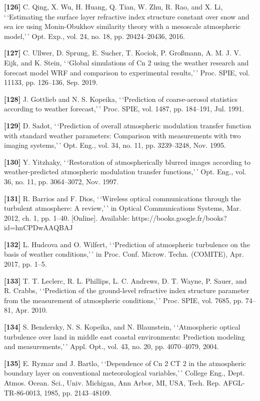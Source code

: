 \documentclass[
]{article}
\begin{document}
\textbf{{[}126{]}} C. Qing, X. Wu, H. Huang, Q. Tian, W. Zhu, R. Rao,
and X. Li, `\,`Estimating the surface layer refractive index structure
constant over snow and sea ice using Monin-Obukhov similarity theory
with a mesoscale atmospheric model,'\,' Opt. Exp., vol. 24, no. 18, pp.
20424--20436, 2016.

\textbf{{[}127{]}} C. Ullwer, D. Sprung, E. Sucher, T. Kociok, P.
Großmann, A. M. J. V. Eijk, and K. Stein, `\,`Global simulations of Cn 2
using the weather research and forecast model WRF and comparison to
experimental results,'\,' Proc. SPIE, vol. 11133, pp. 126--136, Sep.
2019.

\textbf{{[}128{]}} J. Gottlieb and N. S. Kopeika, `\,`Prediction of
coarse-aerosol statistics according to weather forecast,'\,' Proc. SPIE,
vol. 1487, pp. 184--191, Jul. 1991.

\textbf{{[}129{]}} D. Sadot, `\,`Prediction of overall atmospheric
modulation transfer function with standard weather parameters:
Comparison with measurements with two imaging systems,'\,' Opt. Eng.,
vol. 34, no. 11, pp. 3239--3248, Nov. 1995.

\textbf{{[}130{]}} Y. Yitzhaky, `\,`Restoration of atmospherically
blurred images according to weather-predicted atmospheric modulation
transfer functions,'\,' Opt. Eng., vol. 36, no. 11, pp. 3064--3072, Nov.
1997.

\textbf{{[}131{]}} R. Barrios and F. Dios, `\,`Wireless optical
communications through the turbulent atmosphere: A review,'\,' in
Optical Communications Systems, Mar. 2012, ch. 1, pp. 1--40.
{[}Online{]}. Available: https://books.google.fr/books?id=hnCPDwAAQBAJ

\textbf{{[}132{]}} L. Hudcova and O. Wilfert, `\,`Prediction of
atmospheric turbulence on the basis of weather conditions,'\,' in Proc.
Conf. Microw. Techn. (COMITE), Apr. 2017, pp. 1--5.

\textbf{{[}133{]}} T. T. Leclerc, R. L. Phillips, L. C. Andrews, D. T.
Wayne, P. Sauer, and R. Crabbs, `\,`Prediction of the ground-level
refractive index structure parameter from the measurement of atmospheric
conditions,'\,' Proc. SPIE, vol. 7685, pp. 74--81, Apr. 2010.

\textbf{{[}134{]}} S. Bendersky, N. S. Kopeika, and N. Blaunstein,
`\,`Atmospheric optical turbulence over land in middle east coastal
environments: Prediction modeling and measurements,'\,' Appl. Opt., vol.
43, no. 20, pp. 4070--4079, 2004.

\textbf{{[}135{]}} E. Ryznar and J. Bartlo, `\,`Dependence of Cn 2 CT 2
in the atmospheric boundary layer on conventional meteorological
variables,'\,' College Eng., Dept. Atmos. Ocean. Sci., Univ. Michigan,
Ann Arbor, MI, USA, Tech. Rep. AFGL-TR-86-0013, 1985, pp. 2143--48109.
\end{document}
